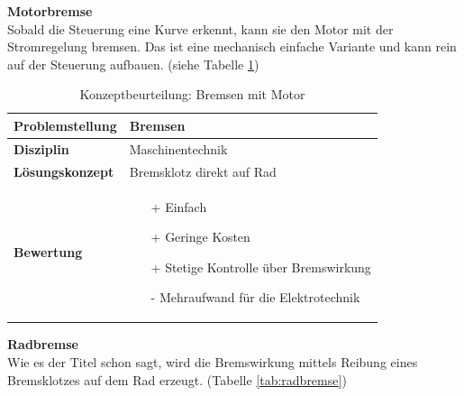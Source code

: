 \documentclass[../../main.tex]{subfiles}
\begin{document}
    \textbf{Motorbremse}\\
    Sobald die Steuerung eine Kurve erkennt, kann sie den Motor mit der Stromregelung bremsen. Das ist eine mechanisch einfache Variante und kann rein auf der Steuerung aufbauen. (siehe Tabelle \ref{tab:motorbremse})

    \begin{flushleft}
        \begin{table}[h]
        \begin{tabular}{ | l | p{11cm} |}
        \hline
        \textbf{Problemstellung} & Bremsen \\ \hline
        \textbf{Disziplin} & Maschinentechnik \\ \hline
        \textbf{Lösungskonzept} & Bremsklotz direkt auf Rad \\ \hline
        \textbf{Bewertung} &  \begin{itemize}
                                \item[+] Einfach
                                \item[+] Geringe Kosten
                                \item[+] Stetige Kontrolle über Bremswirkung 
                                \item[-] Mehraufwand für die Elektrotechnik 
                              \end{itemize} \\ \hline
        \end{tabular}
        \caption{Konzeptbeurteilung: Bremsen mit Motor}
        \label{tab:motorbremse}
    \end{table}
    \end{flushleft}

    \textbf{Radbremse}\\
    Wie es der Titel schon sagt, wird die Bremswirkung mittels Reibung eines Bremsklotzes auf dem Rad erzeugt. (Tabelle \ref{tab:radbremse})
\end{document}

